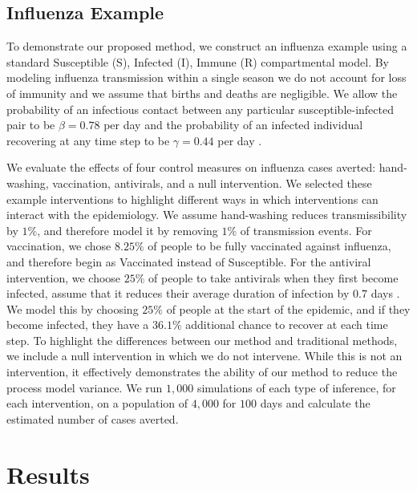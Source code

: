\documentclass[PTRSB]{rsos}
\begin{document}
\begin{multicols}{2}
\subsection*{Influenza Example}
To demonstrate our proposed method, we construct an influenza example using a standard Susceptible (S), Infected (I), Immune (R) compartmental model.
By modeling influenza transmission within a single season we do not account for loss of immunity and we assume that births and deaths are negligible.
We allow the probability of an infectious contact between any particular susceptible-infected pair to be $\beta = 0.78$ per day and the probability of an infected individual recovering at any time step to be $\gamma = 0.44$ per day \cite{forsberg-white-et-al:2009}.

We evaluate the effects of four control measures on influenza cases averted: hand-washing, vaccination, antivirals, and a null intervention.
We selected these example interventions to highlight different ways in which interventions can interact with the epidemiology.
We assume hand-washing reduces transmissibility by $1\%$, and therefore model it by removing $1\%$ of transmission events.
For vaccination, we chose $8.25\%$ of people to be fully vaccinated against influenza, and therefore begin as Vaccinated instead of Susceptible.
For the antiviral intervention, we choose $25\%$ of people to take antivirals when they first become infected, assume that it reduces their average duration of infection by $0.7$ days \cite{oseltamivir:2014}.
We model this by choosing $25\%$ of people at the start of the epidemic, and if they become infected, they have a $36.1\%$ additional chance to recover at each time step.
To highlight the differences between our method and traditional methods, we include a null intervention in which we do not intervene.
While this is not an intervention, it effectively demonstrates the ability of our method to reduce the process model variance.
We run $1,000$ simulations of each type of inference, for each intervention, on a population of $4,000$ for $100$ days and calculate the estimated number of cases averted.

\section{Results}


\end{multicols}
\end{document}
